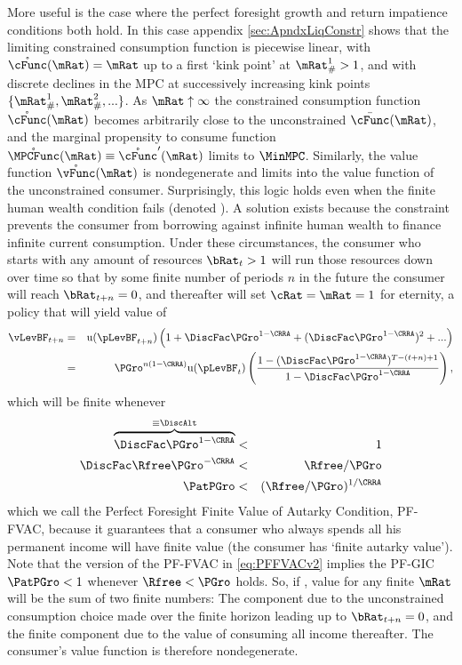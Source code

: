 \documentclass[titlepage]{\econtex}\providecommand{\texname}{BufferStockTheory}%
\begin{document}
More useful is the case where the perfect foresight growth and return impatience conditions both hold.  In this case appendix \ref{sec:ApndxLiqConstr} shows that the limiting constrained consumption function is piecewise linear, with $\mathring{\cFunc}(\mRat)=\mRat$ up to a first `kink point' at $\mRat_{\#}^{1}>1$, and with discrete declines in the MPC at successively increasing kink points $\{\mRat_{\#}^{1},\mRat_{\#}^{2},...\}$.  As $\mRat \uparrow \infty$ the constrained consumption function $\mathring{\cFunc}(\mRat)$ becomes arbitrarily close to the unconstrained $\bar{\cFunc}(\mRat)$, and the marginal propensity to consume function $\mathring{\MPCFunc}(\mRat) \equiv \mathring{\cFunc}^{\prime}(\mRat)$ limits to $\MinMPC$.  Similarly, the value function $\mathring{\vFunc}(\mRat)$ is nondegenerate and limits into the value function of the unconstrained consumer.  Surprisingly, this logic holds even when the finite human wealth condition fails (denoted ).  A solution exists because the constraint prevents the consumer from borrowing against infinite human wealth to finance infinite current consumption.  Under these circumstances, the consumer who starts with any amount of resources $\bRat_{t} > 1$ will run those resources down over time so that by some finite number of periods $n$ in the future the consumer will reach $\bRat_{t+n} = 0$, and thereafter will set $\cRat = \mRat = 1$ for eternity, a policy that will yield value of
\begin{eqnarray}
  \vLevBF_{t+n} & = & \util(\pLevBF_{t+n})\left(1+\DiscFac
    \PGro^{1-\CRRA}+(\DiscFac \PGro^{1-\CRRA})^{2}+...\right) \notag
  \\ & = & \PGro^{n(1-\CRRA)} \util(\pLevBF_{t})\left(\frac{1-(\DiscFac
      \PGro^{1-\CRRA})^{T-(t+n)+1}}{1-\DiscFac \PGro^{1-\CRRA}}\right),
  \notag
\end{eqnarray}
which will be finite whenever
\begin{eqnarray}
   \overbrace{\DiscFac \PGro^{1-\CRRA} }^{\equiv \DiscAlt} & < & 1 \label{eq:PFFVAC}
\\ \DiscFac \Rfree \PGro^{-\CRRA} & < & \Rfree/\PGro \nonumber
\\ \PatPGro & < & (\Rfree/\PGro)^{1/\CRRA} \label{eq:PFFVACv2}
\end{eqnarray}
which we call the Perfect Foresight Finite Value of Autarky Condition, PF-FVAC, because it guarantees that a consumer who always spends all his permanent income will have finite value (the consumer has `finite autarky value').  Note that the version of the PF-FVAC in \eqref{eq:PFFVACv2} implies the PF-GIC $\PatPGro < 1$ whenever  $\Rfree < \PGro$ holds.  So, if , value for any finite $\mRat$ will be the sum of two finite numbers: The component due to the unconstrained consumption choice made over the finite horizon leading up to $\bRat_{t+n} = 0$, and the finite component due to the value of consuming all income thereafter.  The consumer's value function is therefore nondegenerate.
\end{document}
